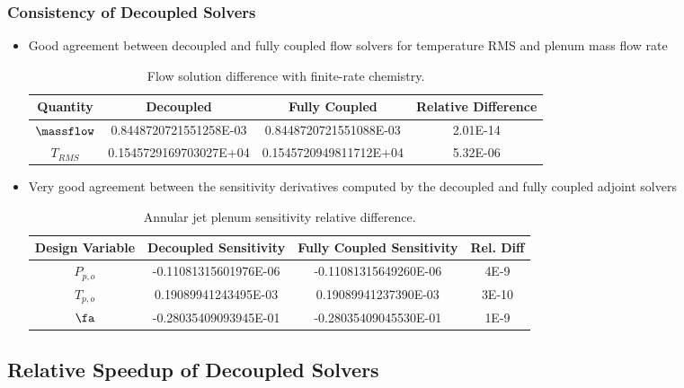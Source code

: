 \documentclass{beamer}
\begin{document}
\begin{frame}
  \frametitle{Consistency of Decoupled Solvers}
  \begin{itemize}
    \item Good agreement between decoupled and fully coupled flow solvers for
      temperature RMS and plenum mass flow rate
    \begin{table}
      \tiny
      \centering
      \begin{tabular}{c|c|c|c}
        Quantity & Decoupled & Fully Coupled & Relative Difference \\
        \hline
        $\massflow$ & 0.8448720721551258E-03 & 0.8448720721551088E-03 & 2.01E-14 \\
        $T_{RMS}$   & 0.1545729169703027E+04 & 0.1545720949811712E+04 & 5.32E-06
      \end{tabular}
      \caption{Flow solution difference with finite-rate chemistry.}
    \end{table}
    \item Very good agreement between the sensitivity derivatives computed by
      the decoupled and fully coupled adjoint solvers
\begin{table}[h]
  \tiny
  \centering
  \begin{tabular}{c|c|c|c}
    Design Variable & Decoupled Sensitivity & Fully Coupled Sensitivity & Rel. Diff\\
    \hline
    $P_{p,o}$ & -0.11081315601976E-06 & -0.11081315649260E-06 & 4E-9  \\
    $T_{p,o}$ &  0.19089941243495E-03 &  0.19089941237390E-03 & 3E-10 \\
    $\fa$     & -0.28035409093945E-01 & -0.28035409045530E-01 & 1E-9
  \end{tabular}
  \caption{Annular jet plenum sensitivity relative difference.}
\end{table}
  \end{itemize}
\end{frame}

\subsection{Relative Speedup of Decoupled Solvers}
\end{document}
